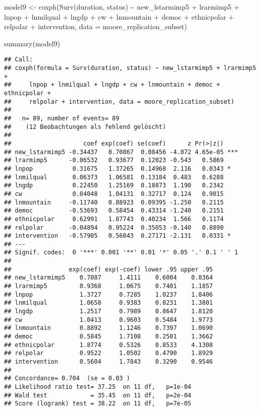 \documentclass[
]{article}
\newenvironment{Shaded}{\begin{snugshade}}{\end{snugshade}}
\newcommand{\AttributeTok}[1]{\textcolor[rgb]{0.77,0.63,0.00}{#1}}
\newcommand{\FunctionTok}[1]{\textcolor[rgb]{0.00,0.00,0.00}{#1}}
\newcommand{\NormalTok}[1]{#1}
\newcommand{\OtherTok}[1]{\textcolor[rgb]{0.56,0.35,0.01}{#1}}
\newcommand{\SpecialCharTok}[1]{\textcolor[rgb]{0.00,0.00,0.00}{#1}}
\begin{document}
\begin{Shaded}
\begin{Highlighting}[]
\NormalTok{model9 }\OtherTok{\textless{}{-}} \FunctionTok{coxph}\NormalTok{(}\FunctionTok{Surv}\NormalTok{(duration, status) }\SpecialCharTok{\textasciitilde{}}\NormalTok{ new\_lstarmimp5 }\SpecialCharTok{+}\NormalTok{ lrarmimp5 }\SpecialCharTok{+}\NormalTok{ lnpop }\SpecialCharTok{+}\NormalTok{ lnmilqual }\SpecialCharTok{+}\NormalTok{ lngdp }\SpecialCharTok{+}\NormalTok{ cw }\SpecialCharTok{+}\NormalTok{ lnmountain }\SpecialCharTok{+}\NormalTok{ democ }\SpecialCharTok{+}\NormalTok{ ethnicpolar }\SpecialCharTok{+}\NormalTok{ relpolar }\SpecialCharTok{+}\NormalTok{ intervention, }\AttributeTok{data =}\NormalTok{ moore\_replication\_subset)}

\FunctionTok{summary}\NormalTok{(model9)}
\end{Highlighting}
\end{Shaded}

\begin{verbatim}
## Call:
## coxph(formula = Surv(duration, status) ~ new_lstarmimp5 + lrarmimp5 + 
##     lnpop + lnmilqual + lngdp + cw + lnmountain + democ + ethnicpolar + 
##     relpolar + intervention, data = moore_replication_subset)
## 
##   n= 89, number of events= 89 
##    (12 Beobachtungen als fehlend gelöscht)
## 
##                    coef exp(coef) se(coef)      z Pr(>|z|)    
## new_lstarmimp5 -0.34437   0.70867  0.08456 -4.072 4.65e-05 ***
## lrarmimp5      -0.06532   0.93677  0.12023 -0.543   0.5869    
## lnpop           0.31675   1.37265  0.14968  2.116   0.0343 *  
## lnmilqual       0.06373   1.06581  0.13184  0.483   0.6288    
## lngdp           0.22450   1.25169  0.18873  1.190   0.2342    
## cw              0.04048   1.04131  0.32717  0.124   0.9015    
## lnmountain     -0.11740   0.88923  0.09395 -1.250   0.2115    
## democ          -0.53693   0.58454  0.43314 -1.240   0.2151    
## ethnicpolar     0.62991   1.87743  0.40234  1.566   0.1174    
## relpolar       -0.04894   0.95224  0.35053 -0.140   0.8890    
## intervention   -0.57905   0.56043  0.27171 -2.131   0.0331 *  
## ---
## Signif. codes:  0 '***' 0.001 '**' 0.01 '*' 0.05 '.' 0.1 ' ' 1
## 
##                exp(coef) exp(-coef) lower .95 upper .95
## new_lstarmimp5    0.7087     1.4111    0.6004    0.8364
## lrarmimp5         0.9368     1.0675    0.7401    1.1857
## lnpop             1.3727     0.7285    1.0237    1.8406
## lnmilqual         1.0658     0.9383    0.8231    1.3801
## lngdp             1.2517     0.7989    0.8647    1.8120
## cw                1.0413     0.9603    0.5484    1.9773
## lnmountain        0.8892     1.1246    0.7397    1.0690
## democ             0.5845     1.7108    0.2501    1.3662
## ethnicpolar       1.8774     0.5326    0.8533    4.1308
## relpolar          0.9522     1.0502    0.4790    1.8929
## intervention      0.5604     1.7843    0.3290    0.9546
## 
## Concordance= 0.704  (se = 0.03 )
## Likelihood ratio test= 37.25  on 11 df,   p=1e-04
## Wald test            = 35.45  on 11 df,   p=2e-04
## Score (logrank) test = 38.22  on 11 df,   p=7e-05
\end{verbatim}
\end{document}
